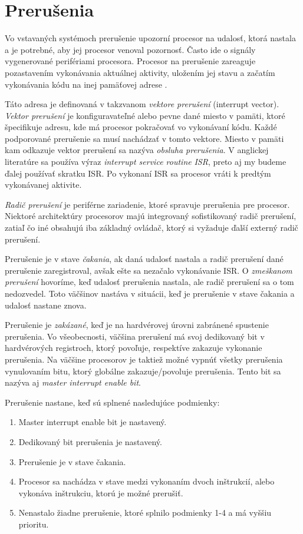 \section{Prerušenia}
\noindent Vo vstavaných systémoch prerušenie upozorní procesor na udalosť, ktorá nastala a je potrebné, aby jej procesor venoval pozornosť. Často ide o signály vygenerované perifériami procesora. Procesor na prerušenie zareaguje pozastavením vykonávania aktuálnej aktivity, uložením jej stavu a začatím vykonávania kódu na inej pamäťovej adrese \cite{wangAutomaticDetectionValidation2017}. \par 
Táto adresa je definovaná v takzvanom \textit{vektore prerušení} (interrupt vector). \textit{Vektor prerušení} je konfiguravateľné alebo pevne dané miesto v pamäti, ktoré špecifikuje adresu, kde má procesor pokračovať vo vykonávaní kódu. Každé podporované prerušenie sa musí nachádzať v tomto vektore. Miesto v pamäti kam odkazuje vektor prerušení sa nazýva \textit{obsluha prerušenia}. V anglickej literatúre sa používa výraz \textit{interrupt service routine} \textit{ISR}, preto aj my budeme ďalej používať skratku  ISR. Po vykonaní  ISR sa procesor vráti k predtým vykonávanej aktivite. \par
\textit{Radič prerušení} je periférne zariadenie, ktoré spravuje prerušenia pre procesor. Niektoré architektúry procesorov majú integrovaný sofistikovaný radič prerušení, zatiaľ čo iné obsahujú iba základný ovládač, ktorý si vyžaduje ďalší externý radič prerušení. \par
Prerušenie je v stave \textit{čakania}, ak daná udalosť nastala a radič prerušení dané prerušenie zaregistroval, avšak ešte sa nezačalo vykonávanie ISR.  O \textit{zmeškanom prerušení} hovoríme, keď udalosť prerušenia nastala, ale radič prerušení sa o tom nedozvedel. Toto väčšinov nastáva v situácii, keď je prerušenie v stave čakania a udalosť nastane znova. \par
Prerušenie je \textit{zakázané}, keď je na hardvérovej úrovni zabránené spustenie prerušenia. Vo všeobecnosti, väčšina prerušení má svoj dedikovaný bit v hardvérových registroch, ktorý povoľuje, respektíve zakazuje vykonanie prerušenia. Na väčšine procesorov je taktiež možné vypnúť všetky prerušenia vynulovaním bitu, ktorý globálne zakazuje/povoluje prerušenia. Tento bit sa nazýva aj \textit{master interrupt enable bit}.\par 
Prerušenie nastane, keď sú splnené nasledujúce podmienky:
\begin{enumerate}
    \item Master interrupt enable bit je nastavený.
    \item Dedikovaný bit prerušenia je nastavený.
    \item Prerušenie je v stave čakania.
    \item Procesor sa nachádza v stave medzi vykonaním dvoch inštrukcií, alebo vykonáva inštrukciu, ktorú je možné prerušiť.
    \item Nenastalo žiadne prerušenie, ktoré splnilo podmienky 1-4 a má vyššiu prioritu.
\end{enumerate} \par


